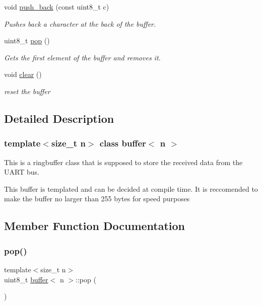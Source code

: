 \begin{DoxyCompactItemize}
void \hyperlink{classbuffer_a9a581b60e734970b849182ecc150590f}{push\+\_\+back} (const uint8\+\_\+t c)
\begin{DoxyCompactList}\small\item\em Pushes back a character at the back of the buffer. \end{DoxyCompactList}\item 
uint8\+\_\+t \hyperlink{classbuffer_a43392276a25538804cf08852d4bd54f6}{pop} ()
\begin{DoxyCompactList}\small\item\em Gets the first element of the buffer and removes it. \end{DoxyCompactList}\item 
\mbox{\label{classbuffer_a3de5ff2f764dd574776d3292ca522a76}} 
void \hyperlink{classbuffer_a3de5ff2f764dd574776d3292ca522a76}{clear} ()
\begin{DoxyCompactList}\small\item\em reset the buffer \end{DoxyCompactList}\end{DoxyCompactItemize}


\subsection{Detailed Description}
\subsubsection*{template$<$size\+\_\+t n$>$\newline
class buffer$<$ n $>$}

This is a ringbuffer class that is supposed to store the received data from the U\+A\+RT bus. 

This buffer is templated and can be decided at compile time. It is reccomended to make the buffer no larger than 255 bytes for speed purposes 

\subsection{Member Function Documentation}
\mbox{\label{classbuffer_a43392276a25538804cf08852d4bd54f6}} 
\subsubsection{\texorpdfstring{pop()}{pop()}}
{\footnotesize\ttfamily template$<$size\+\_\+t n$>$ \\
uint8\+\_\+t \hyperlink{classbuffer}{buffer}$<$ n $>$\+::pop (\begin{DoxyParamCaption}{ }\end{DoxyParamCaption})\hspace{0.3cm}{\ttfamily [inline]}}



